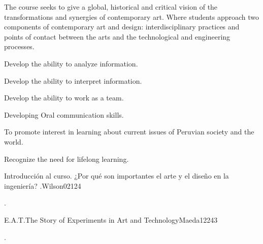 \begin{syllabus}


\begin{justification}
The course seeks to give a global, historical and critical vision of the transformations and synergies of contemporary art. Where students approach two components of contemporary art and design: interdisciplinary practices and points of contact between the arts and the technological and engineering processes.
\end{justification}

\begin{goals}
    \item Develop the ability to analyze information.
    \item Develop the ability to interpret information.
    \item Develop the ability to work as a team.
    \item Developing Oral communication skills.
    \item To promote interest in learning about current issues of Peruvian society and the world.
    \item Recognize the need for lifelong learning.   
\end{goals}

\begin{outcomes}
    \item {}
    \item {}
\end{outcomes}

\begin{competences}
    \item {}
\end{competences}

\begin{unit}{Introducción al curso. ¿Por qué son importantes el arte y el diseño en la ingeniería? .}{}{Wilson02}{12}{4}
   \begin{topics}
      \item . 
   \end{topics}
   \begin{learningoutcomes}
      \item 
   \end{learningoutcomes}
\end{unit}

\begin{unit}{E.A.T.The Story of Experiments in Art and Technology}{}{Maeda12}{24}{3}
   \begin{topics}
      \item . 
   \end{topics}


\end{unit}
\end{syllabus}

